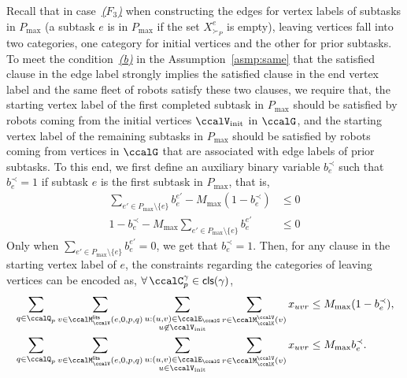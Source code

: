 \documentclass[Afour,sageh,times]{sagej}
\newcommand{\clause}[1]{\mathsf{cls}(#1)}
\begin{document}
{{{{Recall that in case~\hyperref[edge:vertex3]{\it ($F_3$)}  when constructing the edges for vertex labels of subtasks in $P_{\text{max}}$ (a subtask $e$ is in $P_{\text{max}}$ if the set $X_{\succ_P}^e$ is empty), leaving vertices fall into two categories, one category for initial vertices and the other for prior subtasks. To meet the condition~\hyperref[asmp:b]{\it (b)}  in the Assumption~\ref{asmp:same} that the satisfied clause in the edge label strongly implies the satisfied clause in the end vertex label and the same fleet of robots satisfy these two clauses, we require that, the starting vertex label of the first completed  subtask in $P_{\text{max}}$ should be satisfied by robots coming from the initial vertices $\ccalV_{\text{init}}$ in $\ccalG$, and the starting vertex label of the remaining subtasks in $P_{\text{max}}$ should be satisfied by robots coming from vertices in $\ccalG$ that are associated with edge labels of prior subtasks. To this end, we first define an auxiliary binary variable $b_{e}^{\prec}$ such that $b_{e}^{\prec}= 1$ if subtask $e$ is the first subtask in $P_{\text{max}}$, that is,
\begin{subequations}
  \begin{align}
   \sum_{e' \in P_{\text{max}}\setminus \{e\}} {b}_e^{e'}  - M_{\text{max}} (1 - b_{e}^{\prec}) & \leq 0\\
    1 - b_{e}^{\prec} -  M_{\text{max}}  \sum_{e' \in P_{\text{max}}\setminus \{e\}} {b}_e^{e'}    & \leq 0
  \end{align}
\end{subequations}
Only when $ \sum_{e' \in P_{\text{max}}\setminus \{e\}} {b}_e^{e'}=0$, we get that $b_e^{\prec}=1$. Then, for any clause in the starting vertex label of $e$, the constraints regarding the categories of leaving vertices can be encoded as, $\forall \, \ccalC_p^\gamma \in \clause{\gamma} $,
\begin{subequations}\label{eq:routingforactivation}
  \begin{align}
   & \sum_{q\in \ccalQ_p} \sum_{v \in \ccalM^\mathsf{lits}_{\ccalV}(e,0,p,q)} \sum_{\substack{u: (u,v) \in \ccalE_\ccalG \\ u \not\in \ccalV_{\text{init}}}}   \sum_{r\in \ccalM^\ccalV_{\ccalK}(v)} x_{uvr} \leq M_{\text{max}} (1 - b_e^{\prec}),  \label{eq:routingforactivation_a}\\
   & \sum_{q\in \ccalQ_p} \sum_{v \in \ccalM^\mathsf{lits}_{\ccalV}(e,0,p,q)} \sum_{\substack{u: (u,v) \in \ccalE_\ccalG \\ u \in \ccalV_{\text{init}}}}   \sum_{r\in \ccalM^\ccalV_{\ccalK}(v)} x_{uvr} \leq M_{\text{max}}  b_e^{\prec}.  \label{eq:routingforactivation_b}

\end{align}
\end{subequations}}}}}
\end{document}
